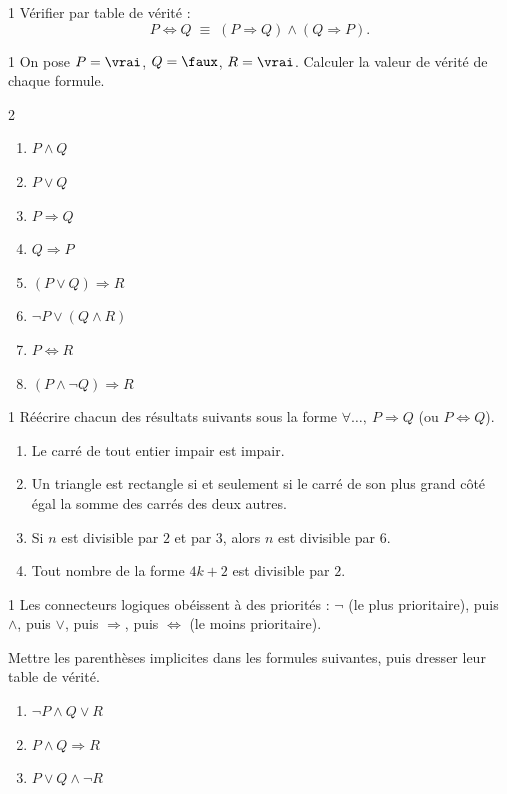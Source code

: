 \begin{exo}{1}
V\'erifier par table de v\'erit\'e :
$$P \Leftrightarrow Q \;\equiv\; (P \Rightarrow Q) \land (Q \Rightarrow P).$$
\end{exo}

\begin{exo}{1}
On pose $P = \vrai$, $Q = \faux$, $R = \vrai$.
Calculer la valeur de v\'erit\'e de chaque formule.
\begin{multicols}{2}
\begin{enumerate}
  \item $P \land Q$
  \item $P \lor Q$
  \item $P \Rightarrow Q$
  \item $Q \Rightarrow P$
  \item $(P \lor Q) \Rightarrow R$
  \item $\lnot P \lor (Q \land R)$
  \item $P \Leftrightarrow R$
  \item $(P \land \lnot Q) \Rightarrow R$
\end{enumerate}
\end{multicols}
\end{exo}

\begin{exo}{1}
R\'e\'ecrire chacun des r\'esultats suivants sous la forme
$\forall \ldots,\ P \Rightarrow Q$ (ou $P \Leftrightarrow Q$).
\begin{enumerate}
  \item Le carr\'e de tout entier impair est impair.
  \item Un triangle est rectangle si et seulement si le carr\'e de son
        plus grand c\^ot\'e \'egal la somme des carr\'es des deux autres.
  \item Si $n$ est divisible par $2$ et par $3$, alors $n$ est divisible par $6$.
  \item Tout nombre de la forme $4k+2$ est divisible par $2$.
\end{enumerate}
\end{exo}

\begin{exo}{1}
Les connecteurs logiques ob\'eissent \`a des priorit\'es :
$\lnot$ (le plus prioritaire), puis $\land$, puis $\lor$, puis $\Rightarrow$,
puis $\Leftrightarrow$ (le moins prioritaire).

Mettre les parenth\`eses implicites dans les formules suivantes,
puis dresser leur table de v\'erit\'e.
\begin{enumerate}
  \item $\lnot P \land Q \lor R$
  \item $P \land Q \Rightarrow R$
  \item $P \lor Q \land \lnot R$
\end{enumerate}
\end{exo}

